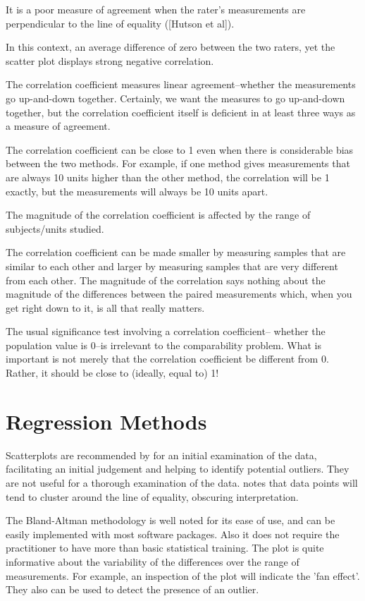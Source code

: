 \documentclass[12pt, a4paper]{report}
\theoremstyle{plain}
\theoremstyle{definition}
\theoremstyle{remark}
\begin{document}
It is a poor measure of agreement when the rater's measurements
are perpendicular to the line of equality ([Hutson et al]). 

In this
context, an average difference of zero between the two raters, yet
the scatter plot displays strong negative correlation.
	

The correlation coefficient measures linear agreement--whether the measurements go up-and-down together. Certainly, we want the measures to go up-and-down together, but the correlation coefficient itself is deficient in at least three ways as a measure of agreement.

The correlation coefficient can be close to 1 even when there is considerable bias between the two methods. For example, if one method gives measurements that are always 10 units higher than the other method, the correlation will be 1 exactly, but the measurements will always be 10 units apart.

The magnitude of the correlation coefficient is affected by the range of subjects/units studied. 

The correlation coefficient can be made smaller by measuring samples that are similar to each other and larger by measuring samples that are very different from each other. The magnitude of the correlation says nothing about the magnitude of the differences between the paired measurements which, when you get right down to it, is all that really matters.

The usual significance test involving a correlation coefficient-- whether the population value is 0--is irrelevant to the comparability problem. What is important is not merely that the correlation coefficient be different from 0. Rather, it should be close to (ideally, equal to) 1!
	

\section{Regression Methods}

Scatterplots are recommended by \citet{BA83} for an initial
examination of the data, facilitating an initial judgement and
helping to identify potential outliers. They are not useful for a
thorough examination of the data. \citet{BritHypSoc} notes that
data points will tend to cluster around the line of equality,
obscuring interpretation.


The Bland-Altman methodology is well noted for its ease of use,
and can be easily implemented with most software packages. Also it
does not require the practitioner to have more than basic
statistical training. The plot is quite informative about the
variability of the differences over the range of measurements. For
example, an inspection of the plot will indicate the 'fan effect'.
They also can be used to detect the presence of an outlier.
\end{document}

